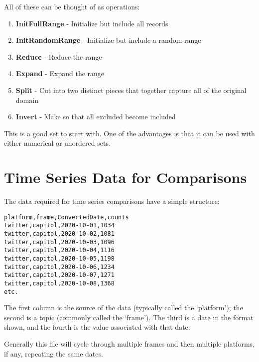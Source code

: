 All of these can be thought of as operations:

\begin{enumerate} \item \textbf{InitFullRange} - Initialize but include all records
\item \textbf{InitRandomRange} - Initialize but include a random range
\item \textbf{Reduce} - Reduce the range
\item \textbf{Expand} - Expand the range
\item \textbf{Split} - Cut into two distinct pieces that together capture all of the original domain
\item \textbf{Invert} - Make so that all excluded become included \end{enumerate}

This is a good set to start with. One of the advantages is that it can be used with either numerical or unordered sets.



\section{Time Series Data for Comparisons}\label{TimeSeriesDataStructure}
The data required for time series comparisons have a simple structure:

\begin{lstlisting}
platform,frame,ConvertedDate,counts
twitter,capitol,2020-10-01,1034
twitter,capitol,2020-10-02,1081
twitter,capitol,2020-10-03,1096
twitter,capitol,2020-10-04,1116
twitter,capitol,2020-10-05,1198
twitter,capitol,2020-10-06,1234
twitter,capitol,2020-10-07,1271
twitter,capitol,2020-10-08,1368
etc.
\end{lstlisting}

The first column is the source of the data (typically called the `platform'); the second is a topic (commonly called the `frame'). The third is a date in the format shown, and the fourth is the value associated with that date.

Generally this file will cycle through multiple frames and then multiple platforms, if any, repeating the same dates.

